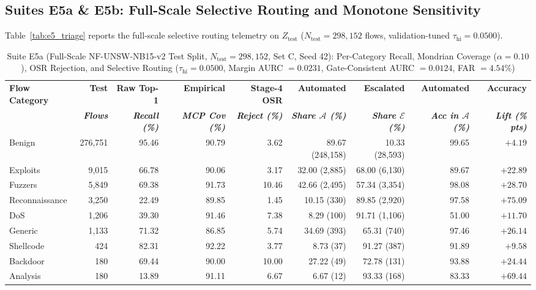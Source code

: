 ﻿\documentclass[conference]{IEEEtran}
\begin{document}
\subsection{Suites E5a \& E5b: Full-Scale Selective Routing and Monotone Sensitivity}
Table~\ref{tab:e5_triage} reports the full-scale selective routing telemetry on $Z_{\text{test}}$ ($N_{\text{test}} = 298,152$ flows, validation-tuned $\tau_{\text{hi}} = 0.0500$).

\begin{table}[t]
\caption{Suite E5a (Full-Scale NF-UNSW-NB15-v2 Test Split, $N_{\text{test}} = 298,152$, Set C, Seed 42): Per-Category Recall, Mondrian Coverage ($\alpha=0.10$), OSR Rejection, and Selective Routing ($\tau_{\text{hi}}=0.0500$, Margin AURC $= 0.0231$, Gate-Consistent AURC $= 0.0124$, FAR $= 4.54\%$)}
\begin{center}
\begin{tabular}{|l|r|r|r|r|r|r|r|r|}
\hline
\textbf{Flow Category} & \textbf{Test} & \textbf{Raw Top-1} & \textbf{Empirical} & \textbf{Stage-4 OSR} & \textbf{Automated} & \textbf{Escalated} & \textbf{Automated} & \textbf{Accuracy} \\
& \textbf{\textit{Flows}} & \textbf{\textit{Recall (\%)}} & \textbf{\textit{MCP Cov (\%)}} & \textbf{\textit{Reject (\%)}} & \textbf{\textit{Share $\mathcal{A}$ (\%)}} & \textbf{\textit{Share $\mathcal{E}$ (\%)}} & \textbf{\textit{Acc in $\mathcal{A}$ (\%)}} & \textbf{\textit{Lift (\% pts)}} \\
\hline
Benign & 276,751 & 95.46 & 90.79 & 3.62 & 89.67 (248,158) & 10.33 (28,593) & 99.65 & $+4.19$ \\
Exploits & 9,015 & 66.78 & 90.06 & 3.17 & 32.00 (2,885) & 68.00 (6,130) & 89.67 & $+22.89$ \\
Fuzzers & 5,849 & 69.38 & 91.73 & 10.46 & 42.66 (2,495) & 57.34 (3,354) & 98.08 & $+28.70$ \\
Reconnaissance & 3,250 & 22.49 & 89.85 & 1.45 & 10.15 (330) & 89.85 (2,920) & 97.58 & $+75.09$ \\
DoS & 1,206 & 39.30 & 91.46 & 7.38 & 8.29 (100) & 91.71 (1,106) & 51.00 & $+11.70$ \\
Generic & 1,133 & 71.32 & 86.85 & 5.74 & 34.69 (393) & 65.31 (740) & 97.46 & $+26.14$ \\
Shellcode & 424 & 82.31 & 92.22 & 3.77 & 8.73 (37) & 91.27 (387) & 91.89 & $+9.58$ \\
Backdoor & 180 & 69.44 & 90.00 & 10.00 & 27.22 (49) & 72.78 (131) & 93.88 & $+24.44$ \\
Analysis & 180 & 13.89 & 91.11 & 6.67 & 6.67 (12) & 93.33 (168) & 83.33 & $+69.44$ \\

\end{tabular}
\end{center}
\end{table}
\end{document}

